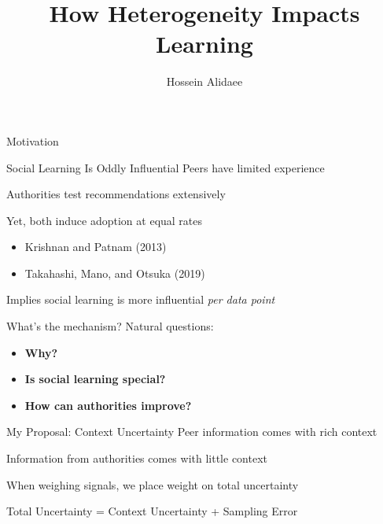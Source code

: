 \documentclass[
  ignorenonframetext,
]{beamer}
\title{How Heterogeneity Impacts Learning}
\author{Hossein Alidaee}
\date{}
\providecommand{\tightlist}{%
  \setlength{\itemsep}{0pt}\setlength{\parskip}{0pt}}\usepackage{longtable,booktabs,array}
\begin{document}
\frame{\titlepage}
\ifdefined\Shaded\renewenvironment{Shaded}{\begin{tcolorbox}[enhanced, interior hidden, borderline west={3pt}{0pt}{shadecolor}, sharp corners, frame hidden, breakable, boxrule=0pt]}{\end{tcolorbox}}\fi

\begin{frame}{Motivation}
\protect\hypertarget{motivation}{}
\end{frame}

\begin{frame}{Social Learning Is Oddly Influential}
\protect\hypertarget{social-learning-is-oddly-influential}{}
Peers have limited experience

Authorities test recommendations extensively

Yet, both induce adoption at equal rates

\begin{itemize}
\tightlist
\item
  Krishnan and Patnam (2013)
\item
  Takahashi, Mano, and Otsuka (2019)
\end{itemize}

Implies social learning is more influential \emph{per data point}
\end{frame}

\begin{frame}{What's the mechanism?}
\protect\hypertarget{whats-the-mechanism}{}
Natural questions:

\begin{itemize}[<+->]
\tightlist
\item
  \textbf{Why?}
\item
  \textbf{Is social learning special?}
\item
  \textbf{How can authorities improve?}
\end{itemize}
\end{frame}

\begin{frame}{My Proposal: Context Uncertainty}
\protect\hypertarget{my-proposal-context-uncertainty}{}
Peer information comes with rich context

Information from authorities comes with little context

When weighing signals, we place weight on total uncertainty

Total Uncertainty = Context Uncertainty + Sampling Error
\end{frame}
\end{document}
